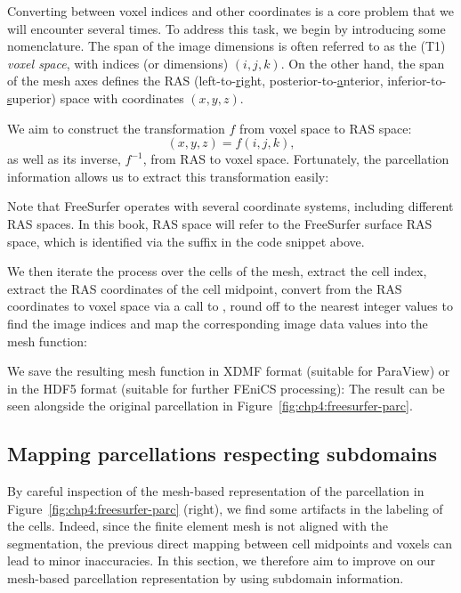 Converting between voxel indices and other coordinates is a core
problem that we will encounter several times. To address this task, we
begin by introducing some nomenclature. The span of the image
dimensions is often referred to as the (T1) \emph{voxel space}, with
indices (or dimensions) $(i, j, k)$. On the other hand, the span of
the mesh axes defines the RAS (left-to-\underline{r}ight, posterior-to-\underline{a}nterior,
inferior-to-\underline{s}uperior) space with coordinates $(x, y, z)$. 

We aim to
construct the transformation $f$ from voxel space to RAS space:
\begin{equation}
  (x, y, z) = f(i, j, k),
\end{equation}
as well as its inverse, $f^{-1}$, from RAS to voxel space. Fortunately,
the parcellation information allows us to extract this transformation easily:

\noindent Note that FreeSurfer operates with several coordinate
systems, including different RAS spaces. In this book, RAS space will
refer to the FreeSurfer surface RAS space, which is identified
via the suffix  in the code snippet above.

We then iterate the process over the cells of the mesh, extract the cell index,
extract the RAS coordinates of the cell midpoint, convert from the RAS
coordinates to voxel space via a call to , round
off to the nearest integer values to find the image indices and map
the corresponding image data values into the  mesh function:

We save the resulting mesh function in XDMF format (suitable for
ParaView) or in the HDF5 format (suitable for further FEniCS processing): 
The result can be seen alongside the original parcellation in
Figure~\ref{fig:chp4:freesurfer-parc}.

\subsection{Mapping parcellations respecting subdomains}
\label{chp4:parcellations}

By careful inspection of the mesh-based representation of the
parcellation in Figure~\ref{fig:chp4:freesurfer-parc} (right), we find
some artifacts in the labeling of the cells. Indeed, since the finite
element mesh is not aligned with the segmentation, the previous direct
mapping between cell midpoints and voxels can lead to minor
inaccuracies. In this section, we therefore aim to improve on our mesh-based
parcellation representation by using subdomain
information. 


